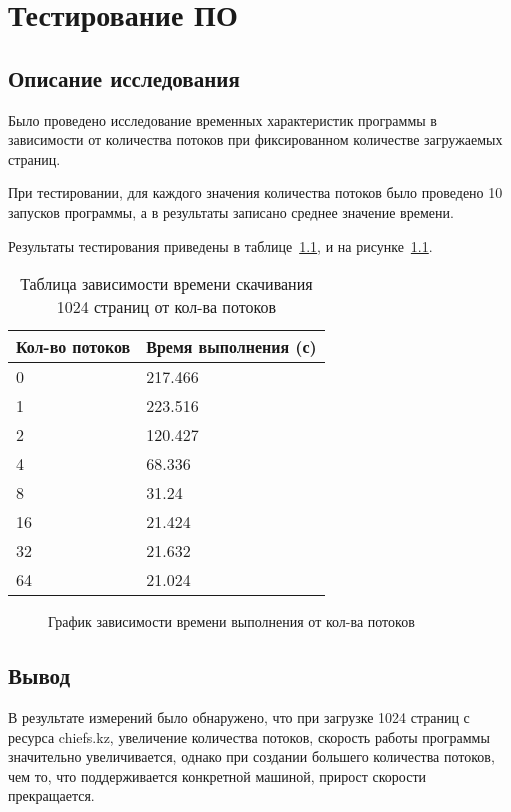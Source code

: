 \chapter{Тестирование ПО}

\section{Описание исследования}

Было проведено исследование временных характеристик программы в зависимости от количества потоков при фиксированном количестве загружаемых страниц.

При тестировании, для каждого значения количества потоков было проведено 10 запусков программы, а в результаты записано среднее значение времени.

Результаты тестирования приведены в таблице~\ref{tbl:results}, и на рисунке~\ref{fig:results}.

\begin{table}[h!]
    \caption{Таблица зависимости времени скачивания 1024 страниц от кол-ва потоков}
    \label{tbl:results}
    \begin{tabular}{|l|l|}    
        \hline
        Кол-во потоков & Время выполнения (с) \\ \hline
        0 & 217.466 \\ \hline
        1 & 223.516 \\ \hline
        2 & 120.427 \\ \hline
        4 & 68.336 \\ \hline
        8 &  31.24 \\ \hline
        16 & 21.424 \\ \hline
        32 & 21.632 \\ \hline
        64 & 21.024 \\ \hline
    \end{tabular}
\end{table}

\begin{figure}[h!]
    \centering
    
    \caption{График зависимости времени выполнения от кол-ва потоков}
    \label{fig:results}
\end{figure}

\section{Вывод}

В результате измерений было обнаружено, что при загрузке 1024 страниц с ресурса chiefs.kz, увеличение количества потоков, скорость работы программы значительно увеличивается, однако при создании большего количества потоков, чем то, что поддерживается конкретной машиной, прирост скорости прекращается.
